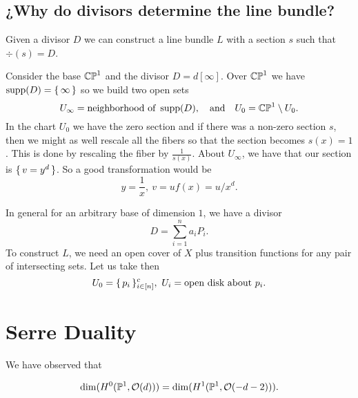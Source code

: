 \documentclass[12pt]{memoir}
\begin{document}
\subsection{¿Why do divisors determine the line bundle?}

Given a divisor $D$ we can construct a line bundle $L$ with a section $s$ such that $\div(s)=D$. 

\begin{Ex}
Consider the base $\mathbb{CP}^1$ and the divisor $D=d[\infty]$. Over $\mathbb{CP}^1$ we have $\operatorname{supp}(D)=\{\,\infty\,\}$ so we build two open sets
$$U_\infty=\text{neighborhood of }\operatorname{supp}(D),\quad\text{and}\quad U_0=\mathbb{CP}^1\setminus U_0.$$
In the chart $U_0$ we have the zero section and if there was a non-zero section $s$, then we might as well rescale all the fibers so that the section becomes $s(x)=1$. This is done by rescaling the fiber by $\frac{1}{s(x)}$. About $U_\infty$, we have that our section is $\{\,v=y^d\,\}$. So a good transformation would be 
$$y=\frac{1}{x},\ v=uf(x)=u/x^d.$$
\end{Ex}

In general for an arbitrary base of dimension $1$, we have a divisor 
$$D=\sum_{i=1}^n a_iP_i.$$
To construct $L$, we need an open cover of $X$ plus transition functions for any pair of intersecting sets. Let us take then 
$$U_0=\set{p_i}_{i\in\bonj{n}}^c,\ U_i=\text{open disk about }p_i.$$


\section{Serre Duality}

We have observed that 

$$\dim(H^0(\mathbb{P}^1,\mathcal{O}(d)))=\dim(H^1(\mathbb{P}^1,\mathcal{O}(-d-2))).$$
\end{document}
